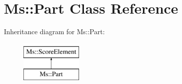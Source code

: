 \hypertarget{class_ms_1_1_part}{}\section{Ms\+:\+:Part Class Reference}
\label{class_ms_1_1_part}
Inheritance diagram for Ms\+:\+:Part\+:\begin{figure}[H]
\begin{center}
\leavevmode
\includegraphics[height=2.000000cm]{class_ms_1_1_part}
\end{center}
\end{figure}
